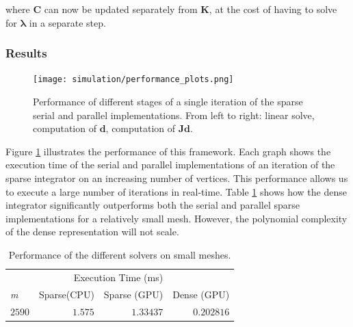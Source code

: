 where $\mathbf{C}$ can now be updated separately from $\mathbf{K}$,
at the cost of having to solve for $\boldsymbol{\lambda}$ in a separate step.



\subsubsection{Results}
\begin{figure}
  \centering
  \texttt{[image: simulation/performance\_plots.png]}
  \caption{
    Performance of different stages of a single iteration of the 
    sparse serial and parallel implementations. From left to right:
    linear solve, computation of $\mathbf{d}$, computation of $\mathbf{Jd}$.
  }
  \label{fig:performance-iteration}
\end{figure}

Figure \ref{fig:performance-iteration} illustrates the performance of this framework.
Each graph shows the execution time of the serial and parallel implementations of
an iteration of the sparse integrator on an increasing
number of vertices. This performance allows us to execute a large number of iterations in real-time. 
Table \ref{table:dense} shows how the dense integrator significantly outperforms 
both the serial and parallel sparse implementations for a relatively small mesh. However, 
the polynomial complexity of the dense representation will not scale. 

\begin{table}[ht]
\caption{Performance of the different solvers on small meshes.}
\centering
\begin{tabular}{lrrr}
\toprule
\multicolumn{3}{r}{Execution Time (ms)} \\
\cmidrule(r){2-4}
\textit{m} & Sparse(CPU) & Sparse (GPU) & Dense (GPU) \\
\midrule
$2590$ & $1.575$ & $1.33437$ & $0.202816$ \\
\bottomrule
\end{tabular}
\label{table:dense}
\end{table}


